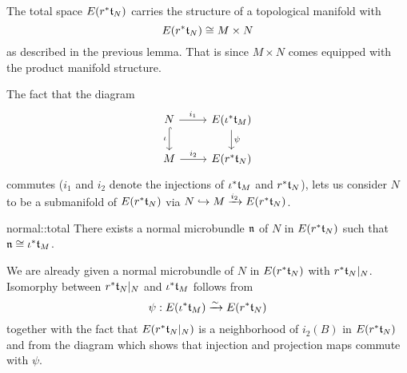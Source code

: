 \begin{myparagraph}
    The total space $E(r^*\mathfrak{t}_N)$ carries the structure of a topological manifold with
    \[ E(r^*\mathfrak{t}_N) \cong M \times N \]
    as described in the previous lemma.
    That is since $M \times N$ comes equipped with the product manifold structure.

    The fact that the diagram
    \[
        \begin{tikzcd}
            N \ar[r, "i_1"] \ar[hookrightarrow, "\iota"']{d} & E(\ind{\iota}\bt_M) \ar[d, "\psi"] \\
            M \ar[r, "i_2"] & E(\ind{r}\bt_N)
        \end{tikzcd}
    \]
    commutes ($i_1$ and $i_2$ denote the injections of $\iota^*\mathfrak{t}_M$ and $r^*\mathfrak{t}_N$),
    lets us consider $N$ to be a submanifold of $E(r^*\mathfrak{t}_N)$ via $N \hookrightarrow{} M \xrightarrow{i_2} E(r^*\mathfrak{t}_N)$.
\end{myparagraph}

\begin{mylemma}{normal::total}
    There exists a normal microbundle $\mathfrak{n}$ of $N$ in $E(r^*\mathfrak{t}_N)$ such that $\mathfrak{n} \cong \iota^*\mathfrak{t}_M$.
\end{mylemma}

\begin{myproof}
    We are already given a normal microbundle of $N$ in $E(r^*\mathfrak{t}_N)$ with $r^*\mathfrak{t}_N\vert_{N}$.
    Isomorphy between $r^*\mathfrak{t}_N\vert_{N}$ and $\iota^*\mathfrak{t}_M$ follows from
    \[ \psi: E(\iota^*\mathfrak{t}_M) \xrightarrow{\sim} E(r^*\mathfrak{t}_N) \]
    together with the fact that $E(r^*\mathfrak{t}_N\vert_{N})$ is a neighborhood of $i_2(B)$ in $E(r^*\mathfrak{t}_N)$
    and from the diagram which shows that injection and projection maps commute with $\psi$.
\end{myproof}